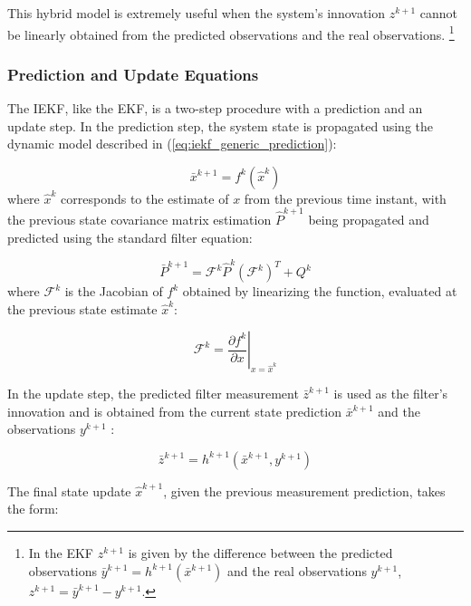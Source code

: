 This hybrid model is extremely useful when the system's innovation $z^{k+1}$ cannot be linearly obtained from the predicted observations and the real observations. \footnote{In the EKF $z^{k+1}$ is given by the difference between the predicted observations $\bar{y}^{k+1}=h^{k+1}\left(\bar{x}^{k+1}\right)$ and the real observations $y^{k+1}$, $z^{k+1}=\bar{y}^{k+1}-y^{k+1}$.}

\subsubsection{Prediction and Update Equations}

The IEKF, like the EKF, is a two-step procedure with a prediction and an update step. In the prediction step, the system state is propagated using the dynamic model described in (\ref{eq:iekf_generic_prediction}):

\begin{equation}
\bar{x}^{k+1}=f^{k}\left(\hat{x}^{k}\right)
\label{eq:iekf_generic_state_prediction}
\end{equation}
where $\hat{x}^{k}$ corresponds to the estimate of $x$ from the previous time instant, with the previous state covariance matrix estimation $\hat{P}^{k+1}$ being propagated and predicted using the standard filter equation:

\begin{equation}
\bar{P}^{k+1}=\mathcal{F}^{k}\hat{P}^{k}\left(\mathcal{F}^{k}\right)^{T}+Q^{k}
\label{eq:iekf_generic_state_cov_prediction}
\end{equation}
where $\mathcal{F}^{k}$ is the Jacobian of $f^{k}$ obtained by linearizing the function, evaluated at the previous state estimate $\hat{x}^{k}$:

\begin{equation}
\mathcal{F}^{k}=\left.\frac{\partial f^{k}}{\partial x}\right|_{x=\hat{x}^{k}}
\end{equation}

In the update step, the predicted filter measurement $\bar{z}^{k+1}$ is used as the filter's innovation and is obtained from the current state prediction $\bar{x}^{k+1}$ and the observations $y^{k+1}$ :

\begin{equation}
\bar{z}^{k+1} = h^{k+1}\left(\bar{x}^{k+1}, y^{k+1}\right)
\label{eq:iekf_generic_measurement}
\end{equation}

The final state update $\hat{x}^{k+1}$, given the previous measurement prediction, takes the form:

